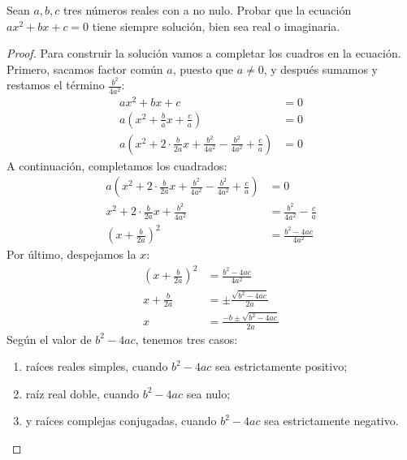\begin{theorem}
    Sean $a,b,c$ tres números reales con a no nulo.
    Probar que la ecuación $ax^2 + bx + c = 0$ tiene siempre solución, bien sea real o imaginaria.
\end{theorem}
\begin{proof}
    Para construir la solución vamos a completar los cuadros en la ecuación.
    Primero, sacamos factor común $a$, puesto que $a \neq 0$, y después sumamos y restamos el término $\frac{b^2}{4a^2}$:
    \begin{align*}
        ax^2 + bx + c &= 0 \\
        a\left(x^2 + \frac{b}{a}x + \frac{c}{a}\right) &= 0 \\
        a\left(x^2 + 2 \cdot \frac{b}{2a}x + \frac{b^2}{4a^2} - \frac{b^2}{4a^2} + \frac{c}{a}\right) &= 0
    \end{align*}
    A continuación, completamos los cuadrados:
    \begin{align*}
        a\left(x^2 + 2 \cdot \frac{b}{2a}x + \frac{b^2}{4a^2} - \frac{b^2}{4a^2} + \frac{c}{a}\right) &= 0 \\
        x^2 + 2 \cdot \frac{b}{2a}x + \frac{b^2}{4a^2} &= \frac{b^2}{4a^2} - \frac{c}{a} \\
        \left( x + \frac{b}{2a} \right)^2 &= \frac{b^2 - 4ac}{4a^2}
    \end{align*}
    Por último, despejamos la $x$:
    \begin{align*}
        \left( x + \frac{b}{2a} \right)^2 &= \frac{b^2 - 4ac}{4a^2} \\
        x + \frac{b}{2a} &= \pm \frac{\sqrt{b^2 - 4ac}}{2a} \\
        x &= \frac{-b \pm \sqrt{b^2 - 4ac}}{2a}
    \end{align*}
    Según el valor de $b^2 - 4ac$, tenemos tres casos:
    \begin{enumerate}
        \item raíces reales simples, cuando $b^2 - 4ac$ sea estrictamente positivo;
        \item raíz real doble, cuando $b^2 - 4ac$ sea nulo;
        \item y raíces complejas conjugadas, cuando $b^2 - 4ac$ sea estrictamente negativo.\qedhere
    \end{enumerate}
\end{proof}
